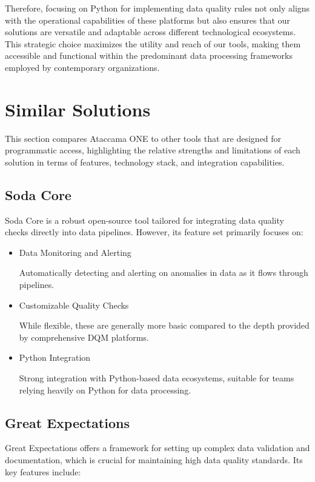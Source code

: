 Therefore, focusing on Python for implementing data quality rules not only aligns with the operational capabilities of these platforms but also ensures that our solutions are versatile and adaptable across different technological ecosystems. This strategic choice maximizes the utility and reach of our  tools, making them accessible and functional within the predominant data processing frameworks employed by contemporary organizations.

\section{Similar Solutions}

This section compares Ataccama ONE to other  tools that are designed for programmatic access, highlighting the relative strengths and limitations of each solution in terms of features, technology stack, and integration capabilities.

\subsection{Soda Core}

Soda Core is a robust open-source tool tailored for integrating data quality checks directly into data pipelines. However, its feature set primarily focuses on:

\begin{itemize}
    \item Data Monitoring and Alerting
    
    Automatically detecting and alerting on anomalies in data as it flows through pipelines.

    \item Customizable Quality Checks

    While flexible, these are generally more basic compared to the depth provided by comprehensive DQM platforms.

    \item Python Integration
    
    Strong integration with Python-based data ecosystems, suitable for teams relying heavily on Python for data processing.
\end{itemize}

\subsection{Great Expectations}

Great Expectations offers a framework for setting up complex data validation and documentation, which is crucial for maintaining high data quality standards. Its key features include:


